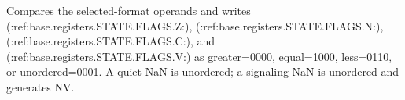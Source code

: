 Compares the selected-format operands and writes (:ref:base.registers.STATE.FLAGS.Z:), (:ref:base.registers.STATE.FLAGS.N:), (:ref:base.registers.STATE.FLAGS.C:), and (:ref:base.registers.STATE.FLAGS.V:) as greater=0000, equal=1000, less=0110, or unordered=0001. A quiet NaN is unordered; a signaling NaN is unordered and generates NV.
